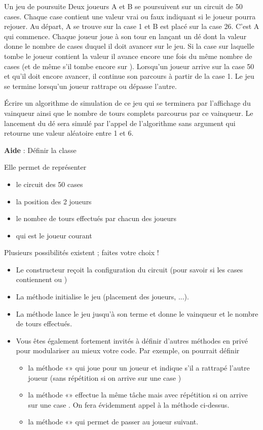 \begin{Exercice}{Un jeu de poursuite}
	Deux joueurs A et B se poursuivent sur un
	circuit de 50 cases. Chaque case contient une valeur vrai ou faux
	indiquant si le joueur pourra rejouer.
	Au départ, A se trouve sur la case 1 et B est placé sur la case 26.
	C’est A qui commence. Chaque joueur joue à son tour en lançant un dé
	dont la valeur donne le nombre de cases duquel il doit avancer sur le
	jeu. Si la case sur laquelle tombe le joueur contient la valeur
	 il avance encore
	une fois du même nombre de cases (et de même s’il tombe encore sur
	). Lorsqu’un joueur
	arrive sur la case 50 et qu’il doit encore avancer, il continue son
	parcours à partir de la case 1. Le jeu se termine lorsqu’un joueur
	rattrape ou dépasse l’autre.

	Écrire un algorithme de simulation de ce jeu
	qui se terminera par l’affichage du vainqueur ainsi que le nombre de
	tours complets parcourus par ce vainqueur. 
	Le lancement du dé sera simulé par l’appel de l'algorithme sans argument
	 qui retourne
	une valeur aléatoire entre 1 et 6.

	\textbf{Aide} :	Définir la classe
	
	Elle permet de représenter
	\begin{itemize}
		\item 
			le circuit des 50 cases
		\item 
			la position des 2 joueurs
		\item 
			le nombre de tours effectués par chacun des joueurs
		\item 
			qui est le joueur courant
	\end{itemize}
	Plusieurs possibilités existent ; faites votre choix !
	\begin{itemize}
		\item 
			Le constructeur reçoit la configuration du circuit (pour savoir si les
			cases contiennent  ou
			)
		\item 
			La méthode  initialise le jeu
			(placement des joueurs, ...).
		\item 
			La méthode  lance le jeu jusqu’à son terme et
			donne le vainqueur et le nombre de tours effectués.
		\item 
			Vous êtes également fortement invités à définir d’autres méthodes en
			privé pour modulariser au mieux votre code. Par exemple, on pourrait
			définir
			\begin{itemize}
				\item 
					la méthode «» qui joue pour un joueur et
					indique s'il a rattrapé l’autre joueur (sans
					répétition si on arrive sur une case )
				\item 
					la méthode «» effectue la même tâche
					mais avec répétition si on arrive sur une case
					. On fera évidemment appel à la méthode
					ci-dessus.
				\item 
					la méthode «» qui permet de passer au
					joueur suivant.
			\end{itemize}
	\end{itemize}
	

\end{Exercice}
